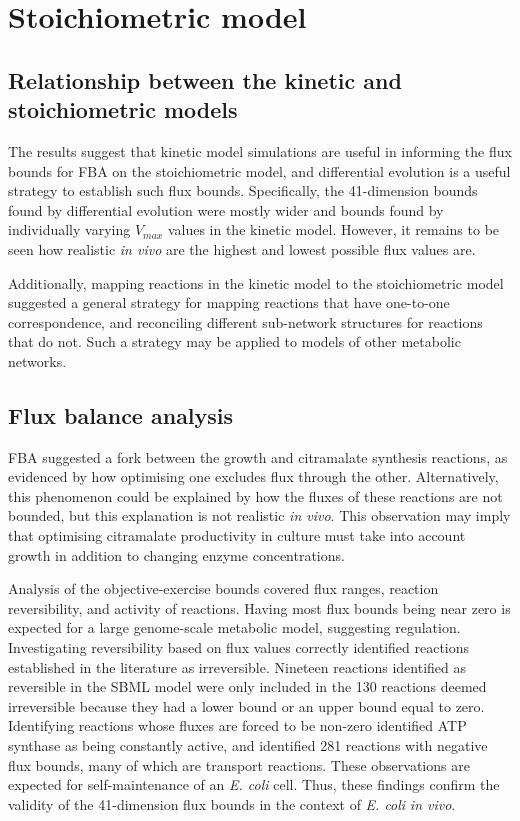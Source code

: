\documentclass[parskip=full, numbers=noenddot]{scrreprt}
\begin{document}
\section{Stoichiometric model}
\label{sec:discussion-stoichiometric}

\subsection{Relationship between the kinetic and stoichiometric models}
\label{ssec:discussion-stoichiometric-ks}


The results suggest that kinetic model simulations are useful in informing the flux bounds for FBA on the stoichiometric model, and differential evolution is a useful strategy to establish such flux bounds. Specifically, the 41-dimension bounds found by differential evolution were mostly wider and bounds found by individually varying $V_{max}$ values in the kinetic model. However, it remains to be seen how realistic \emph{in vivo} are the highest and lowest possible flux values are.

Additionally, mapping reactions in the kinetic model to the stoichiometric model suggested a general strategy for mapping reactions that have one-to-one correspondence, and reconciling different sub-network structures for reactions that do not. Such a strategy may be applied to models of other metabolic networks.

\subsection{Flux balance analysis}
\label{ssec:discussion-stoichiometric-fba}

FBA suggested a fork between the growth and citramalate synthesis reactions, as evidenced by how optimising one excludes flux through the other. Alternatively, this phenomenon could be explained by how the fluxes of these reactions are not bounded, but this explanation is not realistic \emph{in vivo}. This observation may imply that optimising citramalate productivity in culture must take into account growth in addition to changing enzyme concentrations.

Analysis of the objective-exercise bounds covered flux ranges, reaction reversibility, and activity of reactions.
Having most flux bounds being near zero is expected for a large genome-scale metabolic model, suggesting regulation.
Investigating reversibility based on flux values correctly identified reactions established in the literature as irreversible. Nineteen reactions identified as reversible in the SBML model were only included in the 130 reactions deemed irreversible because they had a lower bound or an upper bound equal to zero.
Identifying reactions whose fluxes are forced to be non-zero identified ATP synthase as being constantly active, and identified 281 reactions with negative flux bounds, many of which are transport reactions. These observations are expected for self-maintenance of an \emph{E. coli} cell.
Thus, these findings confirm the validity of the 41-dimension flux bounds in the context of \emph{E. coli} \emph{in vivo}.
\end{document}
